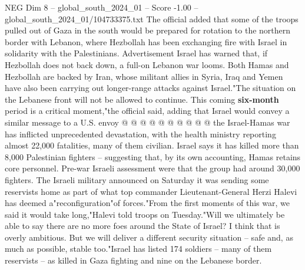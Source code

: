 \begin{textsample}{NEG Dim 8 – global\_south\_2024\_01 – Score -1.00 – global\_south\_2024\_01/104733375.txt}
The official added that some of the troops pulled out of Gaza in the south would be prepared for rotation to the northern border with Lebanon, where Hezbollah has been exchanging fire with Israel in solidarity with the Palestinians.
Advertisement Israel has warned that, if Hezbollah does not back down, a full-on Lebanon war looms.
Both Hamas and Hezbollah are backed by Iran, whose militant allies in Syria, Iraq and Yemen have also been carrying out longer-range attacks against Israel."The situation on the Lebanese front will not be allowed to continue.
This coming \textbf{six-month} period is a critical moment,"the official said, adding that Israel would convey a similar message to a U.S. envoy @ @ @ @ @ @ @ @ @ @ the Israel-Hamas war has inflicted unprecedented devastation, with the health ministry reporting almost 22,000 fatalities, many of them civilian.
Israel says it has killed more than 8,000 Palestinian fighters -- suggesting that, by its own accounting, Hamas retains core personnel.
Pre-war Israeli assessment were that the group had around 30,000 fighters.
The Israeli military announced on Saturday it was sending some reservists home as part of what top commander Lieutenant-General Herzi Halevi has deemed a"reconfiguration"of forces."From the first moments of this war, we said it would take long,"Halevi told troops on Tuesday."Will we ultimately be able to say there are no more foes around the State of Israel?
I think that is overly ambitious.
But we will deliver a different security situation -- safe and, as much as possible, stable too."Israel has listed 174 soldiers -- many of them reservists -- as killed in Gaza fighting and nine on the Lebanese border.

\end{textsample}
